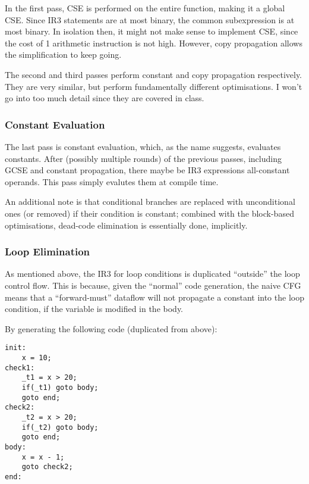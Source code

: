 \documentclass[12pt]{article}
\begin{document}
In the first pass, CSE is performed on the entire function, making it a global CSE. Since IR3 statements are at most binary,
the common subexpression is at most binary. In isolation then, it might not make sense to implement CSE, since the cost of
1 arithmetic instruction is not high. However, copy propagation allows the simplification to keep going.

The second and third passes perform constant and copy propagation respectively. They are very similar, but perform fundamentally
different optimisations. I won't go into too much detail since they are covered in class.




\subsubsection{Constant Evaluation}

The last pass is constant evaluation, which, as the name suggests, evaluates constants. After (possibly multiple rounds) of
the previous passes, including GCSE and constant propagation, there maybe be IR3 expressions all-constant operands. This
pass simply evalutes them at compile time.

An additional note is that conditional branches are replaced with unconditional ones (or removed) if their condition is constant;
combined with the block-based optimisations, dead-code elimination is essentially done, implicitly.




\subsubsection{Loop Elimination}

As mentioned above, the IR3 for loop conditions is duplicated \enquote{outside} the loop control flow. This is because, given the
\enquote{normal} code generation, the naive CFG means that a \enquote{forward-must} dataflow will not propagate a constant
into the loop condition, if the variable is modified in the body.

By generating the following code (duplicated from above):

\begin{verbatim}
init:
	x = 10;
check1:
	_t1 = x > 20;
	if(_t1) goto body;
	goto end;
check2:
	_t2 = x > 20;
	if(_t2) goto body;
	goto end;
body:
	x = x - 1;
	goto check2;
end:
\end{verbatim}
\end{document}
